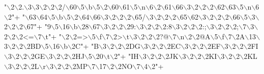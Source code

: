 \begin{DoxyCode}
{        \textcolor{stringliteral}{"\(\backslash\)2\(\backslash\)2.\(\backslash\)3\(\backslash\)3\(\backslash\)2\(\backslash\)2\(\backslash\)2/\(\backslash\)60\(\backslash\)5\(\backslash\)b\(\backslash\)5\(\backslash\)2\(\backslash\)60\(\backslash\)61\(\backslash\)5\(\backslash\)n\(\backslash\)6\(\backslash\)2\(\backslash\)61\(\backslash\)66\(\backslash\)3\(\backslash\)2\(\backslash\)2\(\backslash\)2\(\backslash\)62\(\backslash\)63\(\backslash\)5\(\backslash\)n\(\backslash\)6\(\backslash\)2"}+
        \textcolor{stringliteral}{"\(\backslash\)63\(\backslash\)64\(\backslash\)5\(\backslash\)b\(\backslash\)5\(\backslash\)2\(\backslash\)64\(\backslash\)66\(\backslash\)3\(\backslash\)2\(\backslash\)2\(\backslash\)2\(\backslash\)65/\(\backslash\)3\(\backslash\)2\(\backslash\)2\(\backslash\)2\(\backslash\)65\(\backslash\)62\(\backslash\)3\(\backslash\)2\(\backslash\)2\(\backslash\)2\(\backslash\)66\(\backslash\)5\(\backslash\)3\(\backslash\)2\(\backslash\)2\(\backslash\)2\(\backslash\)67"}+
        \textcolor{stringliteral}{"9\(\backslash\)5\(\backslash\)16\(\backslash\)b\(\backslash\)28\(\backslash\)67\(\backslash\)3\(\backslash\)2\(\backslash\)2\(\backslash\)29:\(\backslash\)3\(\backslash\)2\(\backslash\)2\(\backslash\)2:8\(\backslash\)3\(\backslash\)2\(\backslash\)2\(\backslash\)2:;\(\backslash\)3\(\backslash\)2\(\backslash\)2\(\backslash\)2;\(\backslash\)7\(\backslash\)3\(\backslash\)2\(\backslash\)2\(\backslash\)2<=\(\backslash\)7\(\backslash\)t"}+
        \textcolor{stringliteral}{"\(\backslash\)2\(\backslash\)2=>\(\backslash\)5\(\backslash\)f\(\backslash\)7\(\backslash\)2>\(\backslash\)t\(\backslash\)3\(\backslash\)2\(\backslash\)2\(\backslash\)2?@\(\backslash\)7\(\backslash\)n\(\backslash\)2\(\backslash\)2@A\(\backslash\)5\(\backslash\)f\(\backslash\)7\(\backslash\)2A\(\backslash\)13\(\backslash\)3\(\backslash\)2\(\backslash\)2\(\backslash\)2BD\(\backslash\)5\(\backslash\)16\(\backslash\)b\(\backslash\)2C"}+
        \textcolor{stringliteral}{"B\(\backslash\)3\(\backslash\)2\(\backslash\)2\(\backslash\)2DG\(\backslash\)3\(\backslash\)2\(\backslash\)2\(\backslash\)2EC\(\backslash\)3\(\backslash\)2\(\backslash\)2\(\backslash\)2EF\(\backslash\)3\(\backslash\)2\(\backslash\)2\(\backslash\)2FI\(\backslash\)3\(\backslash\)2\(\backslash\)2\(\backslash\)2GE\(\backslash\)3\(\backslash\)2\(\backslash\)2\(\backslash\)2HJ\(\backslash\)5\(\backslash\)20\(\backslash\)t\(\backslash\)2"}+
        \textcolor{stringliteral}{"IH\(\backslash\)3\(\backslash\)2\(\backslash\)2\(\backslash\)2JK\(\backslash\)3\(\backslash\)2\(\backslash\)2\(\backslash\)2KI\(\backslash\)3\(\backslash\)2\(\backslash\)2\(\backslash\)2KL\(\backslash\)3\(\backslash\)2\(\backslash\)2\(\backslash\)2L\(\backslash\)r\(\backslash\)3\(\backslash\)2\(\backslash\)2\(\backslash\)2MP\(\backslash\)7\(\backslash\)17\(\backslash\)2\(\backslash\)2NO\(\backslash\)7\(\backslash\)4\(\backslash\)2"}+
}
\end{DoxyCode}
